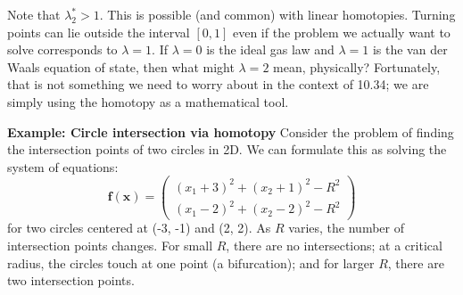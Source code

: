 \begin{exampleBox}
\begin{center}
    \end{center}
    Note that \(\lambda_2^*>1\). This is possible (and common) with linear homotopies. Turning points can lie outside the interval \([0,1]\) even if the problem we actually want to solve corresponds to \(\lambda=1\). If $\lambda=0$ is the ideal gas law and $\lambda=1$ is the van der Waals equation of state, then what might $\lambda=2$ mean, physically? Fortunately, that is not something we need to worry about in the context of 10.34; we are simply using the homotopy as a mathematical tool. 

\end{exampleBox}


\begin{exampleBox}
    \textbf{Example: Circle intersection via homotopy}
    Consider the problem of finding the intersection points of two circles in 2D. We can formulate this as solving the system of equations:
    \[
    \mathbf f(\mathbf x) = \begin{pmatrix} (x_1 + 3)^2 + (x_2 + 1)^2 - R^2 \\ (x_1 - 2)^2 + (x_2 - 2)^2 - R^2 \end{pmatrix}
    \]
    for two circles centered at (-3, -1) and (2, 2). As $R$ varies, the number of intersection points changes. For small $R$, there are no intersections; at a critical radius, the circles touch at one point (a bifurcation); and for larger $R$, there are two intersection points.

    \begin{center}
\end{center}
\end{exampleBox}
